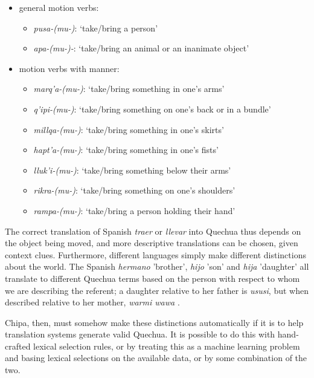 \begin{itemize}
\renewcommand{\labelitemii}{$\bullet$}
 \item[] general motion verbs:
 \begin{itemize}
 \item {\em pusa-(mu-)}: `take/bring a person'
 \item {\em apa-(mu-)-}: `take/bring an animal or an inanimate object'
 \end{itemize}
 \item[] motion verbs with manner:
 \begin{itemize}
 \item {\em marq'a-(mu-)}: `take/bring something in one's arms'
 \item {\em q'ipi-(mu-)}:  `take/bring something on one's back or in a bundle'
 \item {\em millqa-(mu-)}: `take/bring something in one's skirts'
 \item {\em hapt'a-(mu-)}: `take/bring something in one's fists'
 \item {\em lluk'i-(mu-)}: `take/bring something below their arms'
 \item {\em rikra-(mu-)}:  `take/bring something on one's shoulders'
 \item {\em rampa-(mu-)}:  `take/bring a person holding their hand'
 \end{itemize}
\end{itemize}

The correct translation of Spanish {\em traer} or {\em llevar} into Quechua
thus depends on the object being moved, and more descriptive translations can
be chosen, given context clues.
Furthermore, different languages simply make
different distinctions about the world. The Spanish \emph{hermano} 'brother',
\emph{hijo} 'son' and \emph{hija} 'daughter' all translate to different Quechua
terms based on the person with respect to whom we are describing the referent;
a daughter relative to her father is \emph{ususi}, but when described relative
to her mother, \emph{warmi wawa} \cite{academiamayor}.

Chipa, then, must somehow make these distinctions automatically if it is to
help translation systems generate valid Quechua. It is possible to do this with
hand-crafted lexical selection rules, or by treating this as a machine learning
problem and basing lexical selections on the available data, or by some
combination of the two. 

